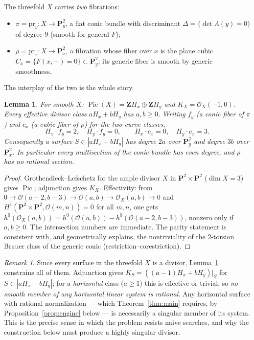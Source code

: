 \documentclass[11pt]{amsart}
\newtheorem{lemma}[theorem]{Lemma}
\theoremstyle{definition}
\theoremstyle{remark}
\newtheorem{remark}[theorem]{Remark}
\newcommand{\PP}{\mathbf{P}}
\newcommand{\ZZ}{\mathbf{Z}}
\newcommand{\Pic}{\operatorname{Pic}}
\newcommand{\Hx}{H_x}
\newcommand{\Hy}{H_y}
\begin{document}
The threefold $X$ carries \emph{two} fibrations:
\begin{itemize}
\item $\pi=\mathrm{pr}_y\colon X\to\PP^2_y$, a flat conic bundle with
discriminant $\Delta=\{\det A(y)=0\}$ of degree $9$ (smooth for general
$F$);
\item $\rho=\mathrm{pr}_x\colon X\to\PP^2_x$, a fibration whose fiber over
$x$ is the plane cubic $C_x=\{F(x,-)=0\}\subset\PP^2_y$; its generic
fiber is smooth by generic smoothness.
\end{itemize}
The interplay of the two is the whole story.

\begin{lemma}\label{lem:pic}
For smooth $X$: $\Pic(X)=\ZZ \Hx\oplus\ZZ \Hy$ and
$K_X=\mathcal O_X(-1,0)$.  Every effective divisor class $a\Hx+b\Hy$ has
$a,b\ge0$.  Writing $f_y$ (a conic fiber of $\pi$) and $c_x$ (a cubic fiber
of $\rho$) for the two curve classes,
\[
\Hx\cdot f_y=2,\quad \Hy\cdot f_y=0,\qquad
\Hx\cdot c_x=0,\quad \Hy\cdot c_x=3 .
\]
Consequently a surface $S\in|a\Hx+b\Hy|$ has degree $2a$ over $\PP^2_y$ and
degree $3b$ over $\PP^2_x$.  In particular every multisection of the conic
bundle has even degree, and $\rho$ has no rational section.
\end{lemma}

\begin{proof}
Grothendieck--Lefschetz for the ample divisor $X$ in $\PP^2\times\PP^2$
($\dim X=3$) gives $\Pic$; adjunction gives $K_X$.  Effectivity: from
$0\to\mathcal O(a-2,b-3)\to\mathcal O(a,b)\to\mathcal O_X(a,b)\to0$ and
$H^1(\PP^2\times\PP^2,\mathcal O(m,n))=0$ for all $m,n$, one gets
$h^0(\mathcal O_X(a,b))=h^0(\mathcal O(a,b))-h^0(\mathcal O(a-2,b-3))$,
nonzero only if $a,b\ge0$.  The intersection numbers are immediate.  The
parity statement is consistent with, and geometrically explains, the
nontriviality of the $2$-torsion Brauer class of the generic conic
(restriction--corestriction).
\end{proof}

\begin{remark}
Since every surface in the threefold $X$ is a divisor,
Lemma~\ref{lem:pic} constrains all of them.  Adjunction gives
$K_S=((a-1)\Hx+b\Hy)|_S$ for $S\in|a\Hx+b\Hy|$; for a \emph{horizontal}
class ($a\ge1$) this is effective or trivial, so \emph{no smooth member of
any horizontal linear system is rational}.  Any horizontal surface with
rational normalization --- which Theorem~\ref{thm:main} requires, by
Proposition~\ref{prop:engine} below --- is necessarily a singular member of
its system.  This is the precise sense in which the problem resists naive
searches, and why the construction below must produce a highly singular
divisor.
\end{remark}
\end{document}
